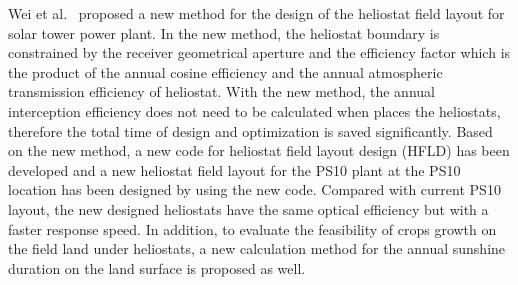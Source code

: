 %

Wei et al.~\cite{Wei2010} proposed a new method for the design of the heliostat field layout for solar tower power plant. In the new method, the heliostat boundary is constrained by the receiver geometrical aperture and the efficiency factor which is the product of the annual cosine efficiency and the annual atmospheric transmission efficiency of heliostat. With the new method, the annual interception efficiency does not need to be calculated when places the heliostats, therefore the total time of design and optimization is saved significantly. Based on the new method, a new code for heliostat field layout design (HFLD) has been developed and a new heliostat field layout for the PS10 plant at the PS10 location has been designed by using the new code. Compared with current PS10 layout, the new designed heliostats have the same optical efficiency but with a faster response speed. In addition, to evaluate the feasibility of crops growth on the field land under heliostats, a new calculation method for the annual sunshine duration on the land surface is proposed as well.

